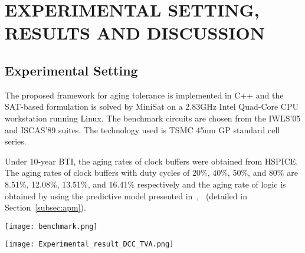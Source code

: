 \section{EXPERIMENTAL SETTING, RESULTS AND DISCUSSION}
\label{sec:exp}
\subsection{Experimental Setting}
The proposed framework for aging tolerance is implemented in C++ and the SAT-based formulation is solved by MiniSat on a 2.83GHz Intel Quad-Core CPU workstation running Linux. The benchmark circuits are chosen from the IWLS'05 and ISCAS'89 suites. The technology used is TSMC 45nm GP standard cell series.

Under 10-year BTI, the aging rates of clock buffers were obtained from HSPICE. The aging rates of clock buffers with duty cycles of 20\%, 40\%, 50\%, and 80\% are 8.51\%, 12.08\%, 13.51\%, and 16.41\% respectively and the aging rate of logic is obtained by using the predictive model presented in~\cite{wang2010impact},~\cite{wang2007efficient} (detailed in Section~\ref{subsec:apm}).


\begin{table*}
\centering
\caption{Benchmark information}
	\texttt{[image: benchmark.png]} %
\label{table:exp1}
\end{table*}
\begin{table*}
\centering
\caption{Results of aging tolerance}
	\texttt{[image: Experimental\_result\_DCC\_TVA.png]} %
\label{table:exp2}
\end{table*}
